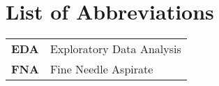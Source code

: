 
\section*{List of Abbreviations}

\begin{tabular}{ l l }
  \textbf{EDA} & Exploratory Data Analysis  \\
  \textbf{FNA} & Fine Needle Aspirate      \\
\end{tabular}
